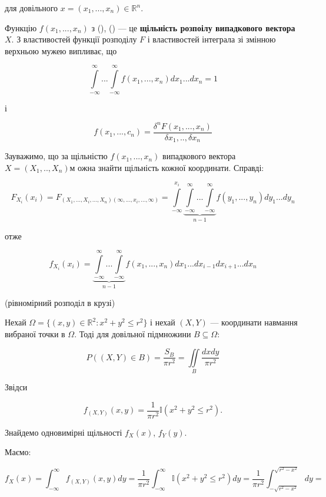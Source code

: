 для довільного $x = (x_1, ..., x_n) \in \mathbb{R}^n$.

Функцію $f(x_1, ..., x_n)$ з (), () --- це \textbf{щільність розпоілу випадкового вектора $X$}.
З властивостей функції розподілу $F$ і властивостей інтеграла зі змінною верхньою мужею випливає, що 

\begin{equation}
    \int\limits_{-\infty}^{\infty} ... \int\limits_{-\infty}^{\infty}
        f(x_1, ..., x_n)dx_1...dx_n
    = 1
\end{equation}

і

\begin{equation}
    f(x_1, ..., c_n)
    = \frac{\delta^n F(x_1, ..., x_n)}{\delta x_1, .., \delta x_n}
\end{equation}

Зауважимо, що за щільністю $f(x_1, ..., x_n)$ випадкового вектора $X = (X_1, .., X_n)$м
ожна знайти щільність кожної координати. Справді:

$$F_{X_i}(x_i)=
F_{(X_1, ..., X_i, ..., X_n)(\infty, ..., x_i, ..., \infty)}
= \int\limits_{-\infty}^{x_i} \underbrace{\int\limits_{-\infty}^{\infty} ... \int\limits_{-\infty}^{\infty}}_{n-1}
    f(y_1, ..., y_n) dy_1 ... dy_n$$

отже

\begin{equation}
    f_{X_i}(x_i) = \underbrace{\int\limits_{-\infty}^{\infty} ... \int\limits_{-\infty}^{\infty}}_{n-1}
    f(x_1, ..., x_n) dx_1 ... dx_{i-1} dx_{i+1} ... dx_n
\end{equation}

\begin{example}(рівномірний розподіл в крузі)

\end{example}

Нехай $\Omega = \{(x, y) \in \mathbb{R}^2: x^2 + y^2 \leqslant r^2\}$ і нехай 
$(X, Y)$ --- координати навмання вибраної точки в $\Omega$. Тоді для довільної
підмножини $B \subseteq \Omega$:

$$P((X, Y) \in B)
= \frac{S_B}{\pi r^2}
= \iint\limits_{B} \frac{dx dy}{\pi r^2}$$

Звідси 

$$f_{(X, Y)} (x, y)
= \frac{1}{\pi r^2} \mathbb{I}(x^2 + y^2 \leqslant r^2).$$

Знайдемо одновимірні щільності $f_X(x)$, $f_Y(y)$.

Маємо:

$$f_X(x)
= \int_{-\infty}^{\infty} f_{(X, Y)}(x, y) dy
= \frac{1}{\pi r^2} \int_{-\infty}^{\infty} \mathbb{I}(x^2 + y^2 \leqslant r^2) dy
= \frac{1}{\pi r^2} \int_{-\sqrt{r^2 - x^2}}^{\sqrt{r^2 - x^2}} dy=$$

